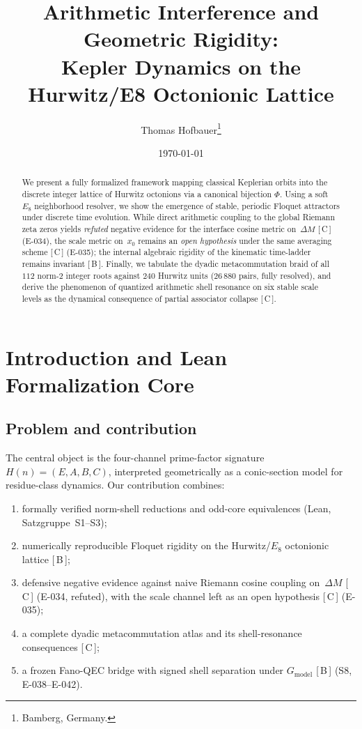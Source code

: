 \documentclass[11pt, lettersize, article]{article}
\title{Arithmetic Interference and Geometric Rigidity: \\ Kepler Dynamics on the Hurwitz/E8 Octonionic Lattice}
\author{Thomas Hofbauer\thanks{Bamberg, Germany.}}
\date{\today}
\theoremstyle{definition}
\theoremstyle{remark}
\newcommand{\evidence}[1]{\textnormal{[\,#1\,]}}
\newcommand{\PhiMap}{\Phi}
\begin{document}
\maketitle

\begin{abstract}
We present a fully formalized framework mapping classical Keplerian orbits into the discrete integer lattice of Hurwitz octonions via a canonical bijection $\PhiMap$.
Using a soft $E_8$ neighborhood resolver, we show the emergence of stable, periodic Floquet attractors under discrete time evolution.
While direct arithmetic coupling to the global Riemann zeta zeros yields \emph{refuted} negative evidence for the interface cosine metric on~$\Delta M$ \evidence{C} (E-034), the scale metric on~$x_0$ remains an \emph{open hypothesis} under the same averaging scheme \evidence{C} (E-035); the internal algebraic rigidity of the kinematic time-ladder remains invariant \evidence{B}.
Finally, we tabulate the dyadic metacommutation braid of all $112$ norm-$2$ integer roots against $240$ Hurwitz units ($26\,880$ pairs, fully resolved), and derive the phenomenon of quantized arithmetic shell resonance on six stable scale levels as the dynamical consequence of partial associator collapse \evidence{C}.
\end{abstract}

\newpage
\tableofcontents
\newpage


\section{Introduction and Lean Formalization Core}
\label{sec:intro}

\subsection{Problem and contribution}

The central object is the four-channel prime-factor signature $H(n)=(E,A,B,C)$, interpreted geometrically as a conic-section model for residue-class dynamics.
Our contribution combines:
\begin{enumerate}
  \item formally verified norm-shell reductions and odd-core equivalences (Lean, Satzgruppe~S1--S3);
  \item numerically reproducible Floquet rigidity on the Hurwitz/$E_8$ octonionic lattice \evidence{B};
  \item defensive negative evidence against naive Riemann cosine coupling on~$\Delta M$ \evidence{C} (E-034, refuted), with the scale channel left as an open hypothesis \evidence{C} (E-035);
  \item a complete dyadic metacommutation atlas and its shell-resonance consequences \evidence{C};
  \item a frozen Fano-QEC bridge with signed shell separation under $G_{\mathrm{model}}$ \evidence{B} (S8, E-038--E-042).
\end{enumerate}
\end{document}
